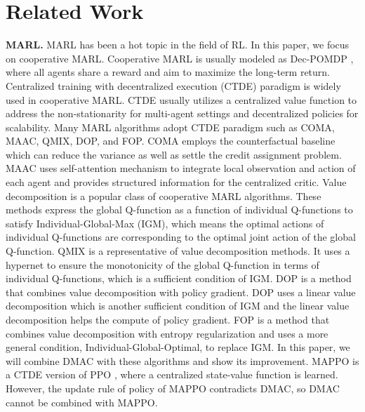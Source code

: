 \documentclass{article}
\begin{document}
\section{Related Work}

\textbf{MARL.} MARL has been a hot topic in the field of RL. In this paper, we focus on cooperative MARL. Cooperative MARL is usually modeled as Dec-POMDP \citep{Dec-POMDP}, where all agents share a reward and aim to maximize the long-term return. Centralized training with decentralized execution (CTDE) \citep{MADDPG} paradigm is widely used in cooperative MARL. CTDE usually utilizes a centralized value function to address the non-stationarity for multi-agent settings and decentralized policies for scalability. Many MARL algorithms adopt CTDE paradigm such as COMA, MAAC, QMIX, DOP, and FOP. COMA \citep{COMA} employs the counterfactual baseline which can reduce the variance as well as settle the credit assignment problem. MAAC \citep{MAAC} uses self-attention mechanism to integrate local observation and action of each agent and provides structured information for the centralized critic. Value decomposition \citep{VDN,QMIX,QTRAN,Qatten,QPLEX,DOP,FOP,DFAC,REQMIX,FACMAC} is a popular class of cooperative MARL algorithms. These methods express the global Q-function as a function of individual Q-functions to satisfy Individual-Global-Max (IGM), which means the optimal actions of individual Q-functions are corresponding to the optimal joint action of the global Q-function. QMIX \citep{QMIX} is a representative of value decomposition methods. It uses a hypernet to ensure the monotonicity of the global Q-function in terms of individual Q-functions, which is a sufficient condition of IGM. DOP \citep{DOP} is a method that combines value decomposition with policy gradient. DOP uses a linear value decomposition which is another sufficient condition of IGM and the linear value decomposition helps the compute of policy gradient. FOP \citep{FOP} is a method that combines value decomposition with entropy regularization and uses a more general condition, Individual-Global-Optimal, to replace IGM. In this paper, we will combine DMAC with these algorithms and show its improvement. MAPPO \citep{MAPPO} is a CTDE version of PPO \citep{PPO}, where a centralized state-value function is learned. However, the update rule of policy of MAPPO contradicts DMAC, so DMAC cannot be combined with MAPPO. 

\end{document}
